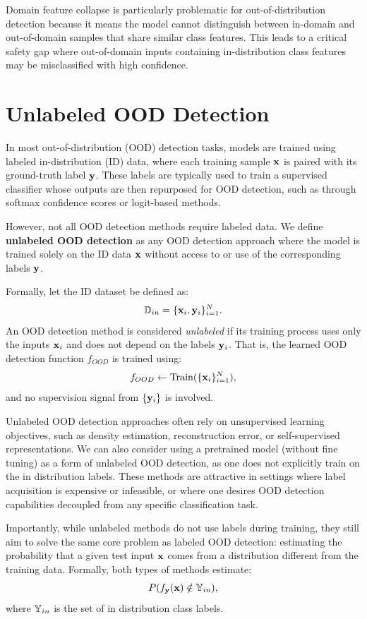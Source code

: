 \documentclass[11pt, oneside]{book}
\theoremstyle{plain}
\theoremstyle{definition}
\theoremstyle{remark}
\begin{document}
Domain feature collapse is particularly problematic for out-of-distribution detection because it means the model cannot distinguish between in-domain and out-of-domain samples that share similar class features. This leads to a critical safety gap where out-of-domain inputs containing in-distribution class features may be misclassified with high confidence.

\section{Unlabeled OOD Detection}

In most out-of-distribution (OOD) detection tasks, models are trained using labeled in-distribution (ID) data, where each training sample \( {\mathbf{x}} \) is paired with its ground-truth label \( {\mathbf{y}} \). These labels are typically used to train a supervised classifier whose outputs are then repurposed for OOD detection, such as through softmax confidence scores or logit-based methods.

However, not all OOD detection methods require labeled data. We define \textbf{unlabeled OOD detection} as any OOD detection approach where the model is trained solely on the ID data \( {\mathbf{x}} \) without access to or use of the corresponding labels \( {\mathbf{y}} \).

Formally, let the ID dataset be defined as:
\[
{\mathbb{D}}_{in} = \{ {\mathbf{x}}_i, {\mathbf{y}}_i \}_{i=1}^N.
\]
An OOD detection method is considered \emph{unlabeled} if its training process uses only the inputs \( {\mathbf{x}}_i \) and does not depend on the labels \( {\mathbf{y}}_i \). That is, the learned OOD detection function \( f_{OOD} \) is trained using:
\[
f_{OOD} \gets \mathrm{Train}(\{ {\mathbf{x}}_i \}_{i=1}^N),
\]
and no supervision signal from \( \{ {\mathbf{y}}_i \} \) is involved.

Unlabeled OOD detection approaches often rely on unsupervised learning objectives, such as density estimation, reconstruction error, or self-supervised representations. We can also consider using a pretrained model (without fine tuning) as a form of unlabeled OOD detection, as one does not explicitly train on the in distribution labels. These methods are attractive in settings where label acquisition is expensive or infeasible, or where one desires OOD detection capabilities decoupled from any specific classification task.

Importantly, while unlabeled methods do not use labels during training, they still aim to solve the same core problem as labeled OOD detection: estimating the probability that a given test input \( {\mathbf{x}} \) comes from a distribution different from the training data. Formally, both types of methods estimate:
\[
P(f_{\mathbf{y}}({\mathbf{x}}) \notin {\mathbb{Y}}_{in}),
\]
where \( {\mathbb{Y}}_{in} \) is the set of in distribution class labels. 
\end{document}
